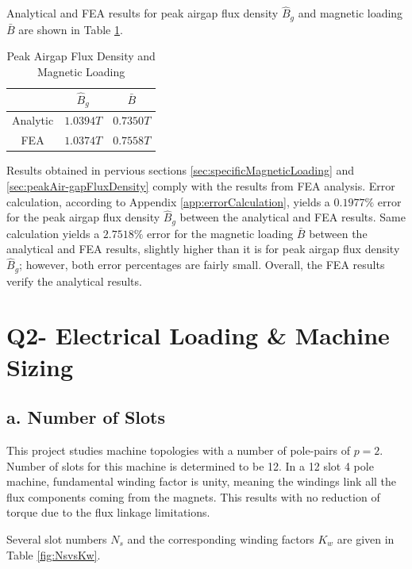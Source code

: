 \documentclass[a4paper, 11pt, titlepage]{article}
\begin{document}
Analytical and FEA results for peak airgap flux density $\hat{B}_g$ and magnetic loading $\bar{B}$ are shown in Table \ref{fig:BpeakandBavg}.

\begin{table}[h]
	\begin{center}
		\begin{tabular}{c|c|c}
			 &  $\hat{B}_g$ & $\bar{B}$ \\
			\hline
			Analytic & $1.0394T$ & $0.7350T$ \\
			\hline
			FEA & $1.0374T$ & $0.7558T$ \\ 
			\hline
		\end{tabular}
	\end{center}
	\caption{Peak Airgap Flux Density and Magnetic Loading}
	\label{fig:BpeakandBavg}
\end{table}

Results obtained in pervious sections \ref{sec:specificMagneticLoading} and \ref{sec:peakAir-gapFluxDensity} comply with the results from FEA analysis. Error calculation, according to Appendix \ref{app:errorCalculation}, yields a $0.1977\%$ error for the peak airgap flux density $\hat{B}_g$ between the analytical and FEA results. Same calculation yields a $2.7518\%$ error for the magnetic loading $\bar{B}$ between the analytical and FEA results, slightly higher than it is for peak airgap flux density $\hat{B}_g$; however, both error percentages are fairly small. Overall, the FEA results verify the analytical results.

\section{Q2- Electrical Loading \& Machine Sizing}
\label{sec:Q2}

\subsection{a. Number of Slots}

This project studies machine topologies with a number of pole-pairs of $p=2$. Number of slots for this machine is determined to be 12. In a 12 slot 4 pole machine, fundamental winding factor is unity, meaning the windings link all the flux components coming from the magnets. This results with no reduction of torque due to the flux linkage limitations.

Several slot numbers $N_s$ and the corresponding winding factors $K_w$ are given in Table \ref{fig:NsvsKw}.
\end{document}
